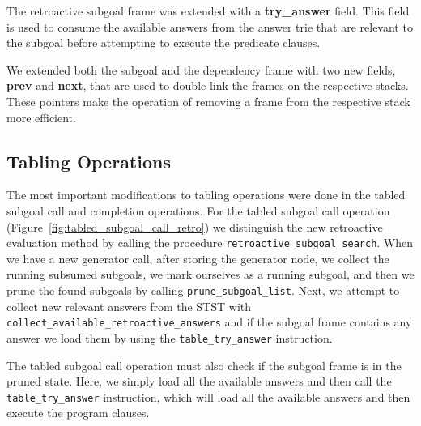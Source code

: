 The retroactive subgoal frame was extended with a \textbf{try\_answer} field. This field is used
to consume the available answers from the answer trie that are relevant to the subgoal
before attempting to execute the predicate clauses.

We extended both the subgoal and the dependency frame with two new fields, \textbf{prev} and
\textbf{next}, that are used to double link the frames on the respective stacks. These pointers
make the operation of removing a frame from the respective stack more efficient.

\subsection{Tabling Operations}

The most important modifications to tabling operations were done in the tabled subgoal call and
completion operations. For the tabled subgoal call operation (Figure~\ref{fig:tabled_subgoal_call_retro})
we distinguish the new retroactive evaluation method by calling the procedure \texttt{retroactive\_subgoal\_search}.
When we have a new generator call, after storing the
generator node, we collect the running subsumed subgoals, we mark ourselves as a running subgoal, and
then we prune the found subgoals by calling \texttt{prune\_subgoal\_list}.
Next, we attempt to collect new relevant answers from the STST with
\texttt{collect\_available\_retroactive\_answers} and if the subgoal frame contains any answer
we load them by using the \texttt{table\_try\_answer} instruction.

The tabled subgoal call operation must also check if the subgoal frame is in the pruned state. Here,
we simply load all the available answers and then call the \texttt{table\_try\_answer} instruction,
which will load all the available answers and then execute the program clauses.


